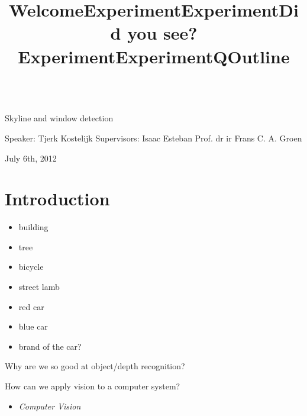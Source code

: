 

\title{Welcome}

{\LARGE {}\\Skyline and window detection}

Speaker: Tjerk Kostelijk
Supervisors:
Isaac Esteban
Prof. dr ir Frans C. A. Groen


July 6th, 2012


\section{Introduction}
\title{Experiment}


\title{Experiment}


\title{Did you see?}
\begin{itemize}
	\item building
	\item tree
	\item bicycle
	\item street lamb
	\item red car
	\item blue car
	\item brand of the car?
\end{itemize}


\title{Experiment}
\title{Experiment}


\title{Q}
\item Why are we so good at object/depth recognition?
\item How can we apply vision to a computer system?
	\begin{itemize}
		\item {\textit{Computer Vision}}
	\end{itemize}


\title{Outline}
 
